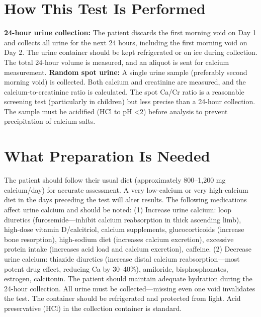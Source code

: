 \section*{How This Test Is Performed}
\textbf{24-hour urine collection:} The patient discards the first morning void on Day 1 and collects all urine for the next 24 hours, including the first morning void on Day 2. The urine container should be kept refrigerated or on ice during collection. The total 24-hour volume is measured, and an aliquot is sent for calcium measurement. \textbf{Random spot urine:} A single urine sample (preferably second morning void) is collected. Both calcium and creatinine are measured, and the calcium-to-creatinine ratio is calculated. The spot Ca/Cr ratio is a reasonable screening test (particularly in children) but less precise than a 24-hour collection. The sample must be acidified (HCl to pH <2) before analysis to prevent precipitation of calcium salts.

\section*{What Preparation Is Needed}
The patient should follow their usual diet (approximately 800--1,200 mg calcium/day) for accurate assessment. A very low-calcium or very high-calcium diet in the days preceding the test will alter results. The following medications affect urine calcium and should be noted: (1) Increase urine calcium: loop diuretics (furosemide---inhibit calcium reabsorption in thick ascending limb), high-dose vitamin D/calcitriol, calcium supplements, glucocorticoids (increase bone resorption), high-sodium diet (increases calcium excretion), excessive protein intake (increases acid load and calcium excretion), caffeine. (2) Decrease urine calcium: thiazide diuretics (increase distal calcium reabsorption---most potent drug effect, reducing Ca by 30--40\%), amiloride, bisphosphonates, estrogen, calcitonin. The patient should maintain adequate hydration during the 24-hour collection. All urine must be collected---missing even one void invalidates the test. The container should be refrigerated and protected from light. Acid preservative (HCl) in the collection container is standard.

